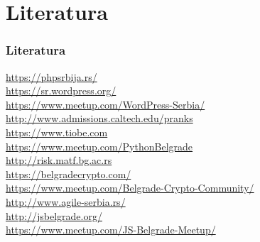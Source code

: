 \documentclass[hyperref={bookmarks=false},aspectratio=169]{beamer}
\begin{document}
\section{Literatura}
\begin{frame}
\frametitle{Literatura}


\footnotesize{\url{https://phpsrbija.rs/}} \\
\footnotesize{\url{https://sr.wordpress.org/}} \\
\footnotesize{\url{https://www.meetup.com/WordPress-Serbia/}} \\
\footnotesize{\url{http://www.admissions.caltech.edu/pranks}} \\
\footnotesize{\url{https://www.tiobe.com}} \\
\footnotesize{\url{https://www.meetup.com/PythonBelgrade}} \\
\footnotesize{\url{http://risk.matf.bg.ac.rs}} \\
\footnotesize{\url{https://belgradecrypto.com/}} \\
\footnotesize{\url{https://www.meetup.com/Belgrade-Crypto-Community/}} \\
\footnotesize{\url{http://www.agile-serbia.rs/}} \\
\footnotesize{\url{http://jsbelgrade.org/}} \\
\footnotesize{\url{https://www.meetup.com/JS-Belgrade-Meetup/}} \\


\end{frame}

% 
% 
% 



\end{document}
